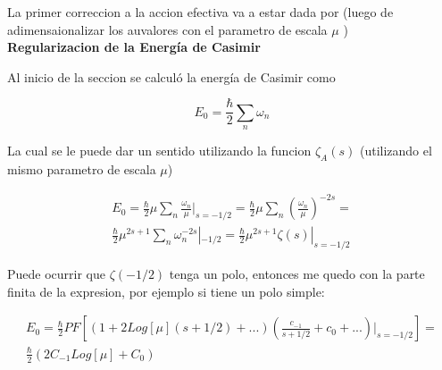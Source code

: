 La primer correccion a la accion efectiva va a estar dada por (luego de adimensaionalizar los auvalores con el parametro de escala $\mu$ ) \\

\textbf{Regularizacion de la Energía de Casimir}

Al inicio de la seccion se calculó la energía de Casimir como

\begin{equation}
E _0 = \frac{\hbar}{2} \sum _n \omega _n 
\end{equation}

La cual se le puede dar un sentido utilizando la funcion $\zeta _A (s) $ (utilizando el mismo parametro de escala $\mu$)

\begin{equation}
\begin{array}{c}
E _0 = \frac{\hbar}{2} \mu  \sum _n  \frac{\omega _n }{\mu } | _{s=-1/2} = 
\frac{\hbar}{2} \mu  \sum _{n} \left( \frac{\omega _n}{\mu } \right) ^ {-2 s} = \\
\frac{\hbar}{2} \mu ^{2s+1} \sum _n \omega _n ^{-2s} | _{-1/2} =  
\frac{\hbar}{2} \mu ^{2s+1} \zeta  (s) | _{s=-1/2}
\end{array}
\end{equation}


Puede ocurrir que $\zeta (-1/2) $ tenga un polo, entonces me quedo con la parte finita de la expresion, por ejemplo si tiene un polo simple:

\begin{equation}
\begin{array}{c}
E_0 = \frac{\hbar}{2}
PF
\left[
	\left(
		1 + 2 Log [ \mu ] (s+1/2) + ...
		\right)
	\left(
		\frac{c_{-1}}{s+1/2} + c _0 + ...
		\right) | _{s=-1/2}
		\right] = \\
\frac{\hbar}{2}
(2 C _{-1} Log[\mu ] + C_0 )
\end{array}
\end{equation}